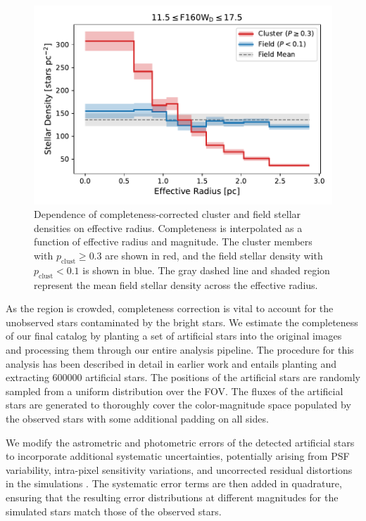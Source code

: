 \documentclass[12pt]{ucsddissertation}
\newcommand{\pclust}{p_{\mathrm{clust}}}
\begin{document}
\begin{CJK*}{UTF8}{gbsn}
\begin{figure}[htb!]
    \centering
    \includegraphics[width = 0.7\linewidth]{figures/chapter2/Field_Stellar_Density_11.5_17.5.pdf}
    \caption[Completeness-corrected cluster and field stellar density vs. effective radius]{Dependence of completeness-corrected cluster and field stellar densities on effective radius. Completeness is interpolated as a function of effective radius and magnitude. The cluster members with $\pclust \geq 0.3$ are shown in red, and the field stellar density with $\pclust < 0.1$ is shown in blue. The gray dashed line and shaded region represent the mean field stellar density across the effective radius.}
    \label{fig:field_density}
\end{figure}

As the region is crowded, completeness correction is vital to account for the unobserved stars contaminated by the bright stars. We estimate the completeness of our final catalog by planting a set of artificial stars into the original images and processing them through our entire analysis pipeline. The procedure for this analysis has been described in detail in earlier work \citep{Lu-2013, Hosek-2015, Hosek-2019, Rui-2019} and entails planting and extracting \num{600000} artificial stars. The positions of the artificial stars are randomly sampled from a uniform distribution over the FOV. The fluxes of the artificial stars are generated to thoroughly cover the color-magnitude space populated by the observed stars with some additional padding on all sides. 

We modify the astrometric and photometric errors of the detected artificial stars to incorporate additional systematic uncertainties, potentially arising from PSF variability, intra-pixel sensitivity variations, and uncorrected residual distortions in the simulations \citep{Hosek-2015}. The systematic error terms are then added in quadrature, ensuring that the resulting error distributions at different magnitudes for the simulated stars match those of the observed stars.


\end{CJK*}
\end{document}
